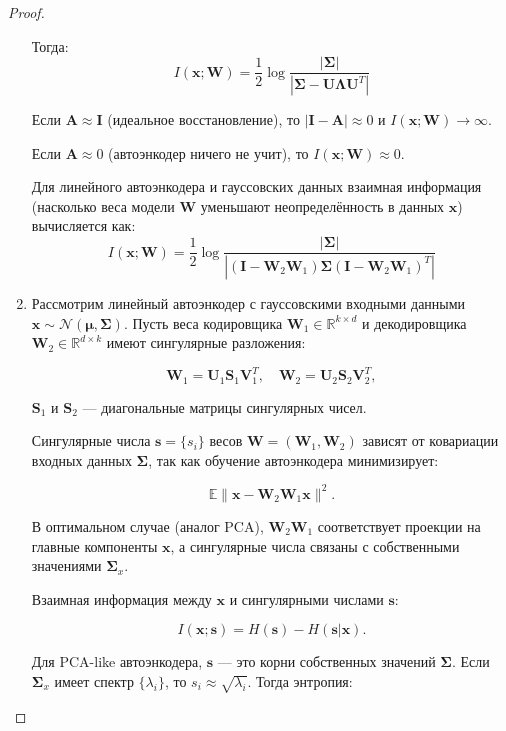 \documentclass[a4paper, 14pt]{article}
\begin{document}
\begin{proof}
\begin{enumerate}
Тогда:  
\[I(\mathbf{x}; \mathbf{W}) = \frac{1}{2} \log \frac{|\boldsymbol{\Sigma}|}{|\boldsymbol{\Sigma} - \mathbf{U} \mathbf{\Lambda} \mathbf{U}^T|}\]  

Если $\mathbf{A} \approx \mathbf{I}$ (идеальное восстановление), то $|\mathbf{I} - \mathbf{A}| \approx 0$ и $I(\mathbf{x}; \mathbf{W}) \to \infty$.  

Если $\mathbf{A} \approx 0$ (автоэнкодер ничего не учит), то $I(\mathbf{x}; \mathbf{W}) \approx 0$. 

Для линейного автоэнкодера и гауссовских данных взаимная информация (насколько веса модели $\mathbf{W}$ уменьшают неопределённость в данных $\mathbf{x}$) вычисляется как:  
\[I(\mathbf{x}; \mathbf{W}) = \frac{1}{2} \log \frac{|\boldsymbol{\Sigma}|}{|(\mathbf{I} - \mathbf{W}_2 \mathbf{W}_1) \boldsymbol{\Sigma} (\mathbf{I} - \mathbf{W}_2 \mathbf{W}_1)^T|}\]

    \item Рассмотрим линейный автоэнкодер с гауссовскими входными данными $\mathbf{x} \sim \mathcal{N}(\boldsymbol{\mu}, \boldsymbol{\Sigma})$. Пусть веса кодировщика $\mathbf{W}_1 \in \mathbb{R}^{k \times d}$ и декодировщика $\mathbf{W}_2 \in \mathbb{R}^{d \times k}$ имеют сингулярные разложения:

\[\mathbf{W}_1 = \mathbf{U}_1 \mathbf{S}_1 \mathbf{V}_1^T, \quad \mathbf{W}_2 = \mathbf{U}_2 \mathbf{S}_2 \mathbf{V}_2^T,\]

 $\mathbf{S}_1$ и $\mathbf{S}_2$ — диагональные матрицы сингулярных чисел.

Сингулярные числа $\mathbf{s} = \{s_i\}$ весов $\mathbf{W} = (\mathbf{W}_1, \mathbf{W}_2)$ зависят от ковариации входных данных $\boldsymbol{\Sigma}$, так как обучение автоэнкодера минимизирует:

\[\mathbb{E} \|\mathbf{x} - \mathbf{W}_2 \mathbf{W}_1 \mathbf{x}\|^2.\]

В оптимальном случае (аналог PCA), $\mathbf{W}_2 \mathbf{W}_1$ соответствует проекции на главные компоненты $\mathbf{x}$, а сингулярные числа связаны с собственными значениями $\boldsymbol{\Sigma}_x$.

Взаимная информация между $\mathbf{x}$ и сингулярными числами $\mathbf{s}$:

\[I(\mathbf{x}; \mathbf{s}) = H(\mathbf{s}) - H(\mathbf{s} | \mathbf{x}).\]

Для PCA-like автоэнкодера, $\mathbf{s}$ — это корни собственных значений $\boldsymbol{\Sigma}$. Если $\boldsymbol{\Sigma}_x$ имеет спектр $\{\lambda_i\}$, то $s_i \approx \sqrt{\lambda_i}$. Тогда энтропия:


\end{enumerate}
\end{proof}
\end{document}
